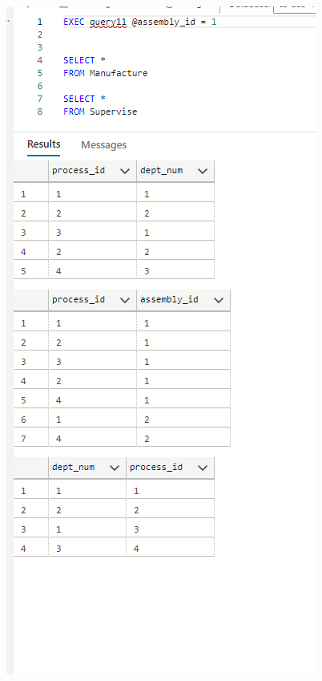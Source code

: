 \documentclass[11pt]{article}
\begin{document}
\begin{enumerate}
\includegraphics[width = \textwidth]{assembly2.png}


\end{enumerate}
\end{document}
